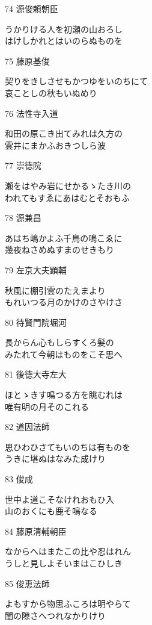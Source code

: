 \begin{shiika}
\end{shiika}74 源俊頼朝臣   \begin{shiika}うかりける人を初瀬の山おろし\\はけしかれとはいのらぬものを 
\end{shiika}75 藤原基俊     \begin{shiika}契りをきしさせもかつゆをいのちにて\\哀ことしの秋もいぬめり 
\end{shiika}76 法性寺入道   \begin{shiika}和田の原こき出てみれは久方の\\雲井にまかふおきつしら波 
\end{shiika}77 崇徳院       \begin{shiika}瀬をはやみ岩にせかるゝたき川の\\われてもすゑにあはむとそおもふ
\end{shiika}78 源兼昌      \begin{shiika}あはち嶋かよふ千鳥の鳴こゑに\\幾夜ねさめぬすまのせきもり 
\end{shiika}79 左京大夫顕輔 \begin{shiika}秋風に棚引雲のたえまより\\もれいつる月のかけのさやけさ 
\end{shiika}80 待賢門院堀河 \begin{shiika}長からん心もしらすくろ髮の\\みたれて今朝はものをこそ思へ 
\end{shiika}81 後徳大寺左大 \begin{shiika}ほとゝきす鳴つる方を眺むれは\\唯有明の月そのこれる 
\end{shiika}82 道因法師     \begin{shiika}思ひわひさてもいのちは有ものを\\うきに堪ぬはなみた成けり 
\end{shiika}83 俊成         \begin{shiika}世中よ道こそなけれおもひ入　\\山のおくにも鹿そ鳴なる 
\end{shiika}84 藤原清輔朝臣 \begin{shiika}なからへはまたこの比や忍はれん\\うしと見しよそいまはこひしき 
\end{shiika}85 俊恵法師     \begin{shiika}よもすから物思ふころは明やらて\\閨の隙さへつれなかりけり 

\end{shiika}
